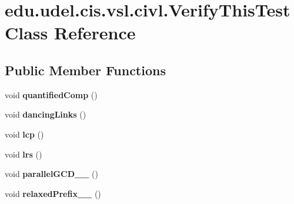 \hypertarget{classedu_1_1udel_1_1cis_1_1vsl_1_1civl_1_1VerifyThisTest}{}\section{edu.\+udel.\+cis.\+vsl.\+civl.\+Verify\+This\+Test Class Reference}
\label{classedu_1_1udel_1_1cis_1_1vsl_1_1civl_1_1VerifyThisTest}
\subsection*{Public Member Functions}
\begin{DoxyCompactItemize}
\item 
\hypertarget{classedu_1_1udel_1_1cis_1_1vsl_1_1civl_1_1VerifyThisTest_a029292ded862a2bd71a1b11830e5df2d}{}void {\bfseries quantified\+Comp} ()\label{classedu_1_1udel_1_1cis_1_1vsl_1_1civl_1_1VerifyThisTest_a029292ded862a2bd71a1b11830e5df2d}

\item 
\hypertarget{classedu_1_1udel_1_1cis_1_1vsl_1_1civl_1_1VerifyThisTest_a76cf437303821ef8a64f279dd31d09ed}{}void {\bfseries dancing\+Links} ()\label{classedu_1_1udel_1_1cis_1_1vsl_1_1civl_1_1VerifyThisTest_a76cf437303821ef8a64f279dd31d09ed}

\item 
\hypertarget{classedu_1_1udel_1_1cis_1_1vsl_1_1civl_1_1VerifyThisTest_a5d2a0244d73a1d54ec33a581210652c7}{}void {\bfseries lcp} ()\label{classedu_1_1udel_1_1cis_1_1vsl_1_1civl_1_1VerifyThisTest_a5d2a0244d73a1d54ec33a581210652c7}

\item 
\hypertarget{classedu_1_1udel_1_1cis_1_1vsl_1_1civl_1_1VerifyThisTest_a7be6ab47dc5688ad542bfc5d12d1552c}{}void {\bfseries lrs} ()\label{classedu_1_1udel_1_1cis_1_1vsl_1_1civl_1_1VerifyThisTest_a7be6ab47dc5688ad542bfc5d12d1552c}

\item 
\hypertarget{classedu_1_1udel_1_1cis_1_1vsl_1_1civl_1_1VerifyThisTest_a92a20f4a6625c82f0b321a136484ef53}{}void {\bfseries parallel\+G\+C\+D\+\_\+\_} ()\label{classedu_1_1udel_1_1cis_1_1vsl_1_1civl_1_1VerifyThisTest_a92a20f4a6625c82f0b321a136484ef53}

\item 
\hypertarget{classedu_1_1udel_1_1cis_1_1vsl_1_1civl_1_1VerifyThisTest_ae464f7bd35b94f5e57cc0b83a686e52a}{}void {\bfseries relaxed\+Prefix\+\_\+\_} ()\label{classedu_1_1udel_1_1cis_1_1vsl_1_1civl_1_1VerifyThisTest_ae464f7bd35b94f5e57cc0b83a686e52a}


\end{DoxyCompactItemize}
